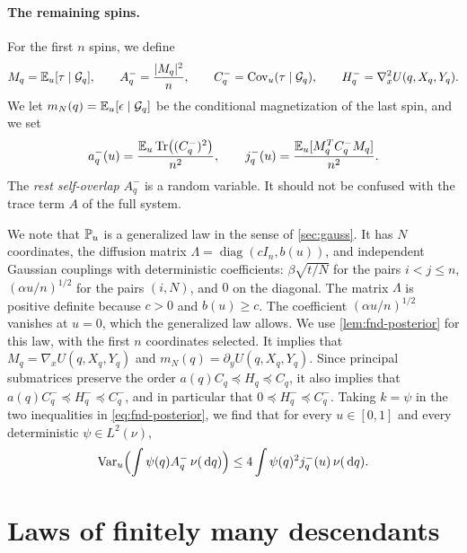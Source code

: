 \paragraph{The remaining spins.}
For the first $n$ spins, we define
\[
 M_q=\mathbb E_u[\tau\mid\mathcal G_q],\qquad A_q^-=\frac{|M_q|^2}{n},\qquad
 C_q^-=\operatorname{Cov}_u(\tau\mid\mathcal G_q),\qquad
 H_q^-=\nabla_x^2U(q,X_q,Y_q).
\]
We let $m_N(q)=\mathbb E_u[\epsilon\mid\mathcal G_q]$ be the conditional
magnetization of the last spin, and we set
\begin{equation}\label{eq:cav-rest-errors}
 a_q^-(u)=\frac{\mathbb E_u\operatorname{Tr}\bigl((C_q^-)^2\bigr)}{n^2},\qquad
 j_q^-(u)=\frac{\mathbb E_u[M_q^TC_q^-M_q]}{n^2}.
\end{equation}
The \emph{rest self-overlap} $A_q^-$ is a random variable. It should not
be confused with the trace term $A$ of the full system.

We note that $\mathbb P_u$ is a generalized law in the sense of \cref{sec:gauss}.
It has $N$ coordinates, the diffusion matrix
$\Lambda=\operatorname{diag}(cI_n,b(u))$, and independent Gaussian
couplings with deterministic coefficients: $\beta\sqrt{t/N}$ for the
pairs $i<j\le n$, $(\alpha u/n)^{1/2}$ for the pairs $(i,N)$, and $0$ on
the diagonal. The matrix $\Lambda$ is positive definite because $c>0$
and $b(u)\ge c$. The coefficient $(\alpha u/n)^{1/2}$ vanishes at $u=0$,
which the generalized law allows. We use \cref{lem:fnd-posterior} for this
law, with the first $n$ coordinates selected. It implies that
$M_q=\nabla_xU(q,X_q,Y_q)$ and $m_N(q)=\partial_yU(q,X_q,Y_q)$. Since
principal submatrices preserve the order $a(q)C_q\preceq H_q\preceq C_q$,
it also implies that $a(q)C_q^-\preceq H_q^-\preceq C_q^-$, and in
particular that $0\preceq H_q^-\preceq C_q^-$. Taking $k=\psi$ in the two
inequalities in \eqref{eq:fnd-posterior}, we find that for every
$u\in[0,1]$ and every deterministic $\psi\in L^2(\nu)$,
\begin{equation}\label{eq:cl-BL}
 \operatorname{Var}_u\Bigl(\int\psi(q)A_q^-\,\nu(\,\mathrm d q)\Bigr)
 \le4\int\psi(q)^2j_q^-(u)\,\nu(\,\mathrm d q).
\end{equation}

\section{Laws of finitely many descendants}\label{subsec:c7-tree}

